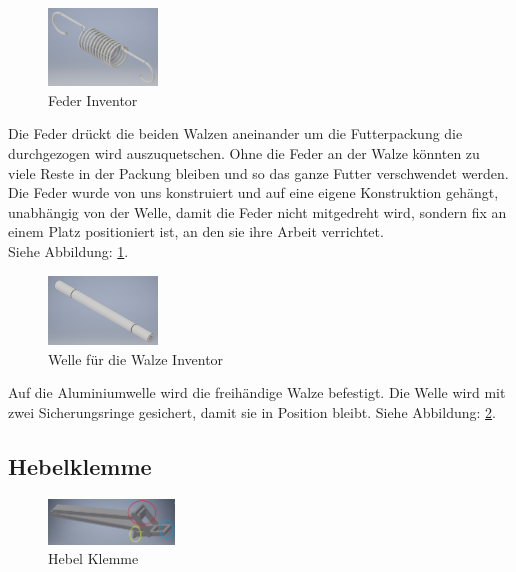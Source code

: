 \begin{figure}
\vspace{-20pt}
  \begin{center}
    \includegraphics[width=0.26\textwidth]{Bilder/Inventor/Feder}
  \end{center}
  \caption{Feder Inventor}
  \label{Feder_Inventor}
\end{figure}

Die Feder drückt die beiden Walzen aneinander um die Futterpackung die durchgezogen wird auszuquetschen. Ohne die Feder an der Walze könnten zu viele Reste in der Packung bleiben und so das ganze Futter verschwendet werden. Die Feder wurde von uns konstruiert und auf eine eigene Konstruktion gehängt, unabhängig von der Welle, damit die Feder nicht mitgedreht wird, sondern fix an einem Platz positioniert ist, an den sie ihre Arbeit verrichtet. \\Siehe Abbildung: \ref{Feder_Inventor}.\\

\begin{figure}
\vspace{-20pt}
  \begin{center}
    \includegraphics[width=0.26\textwidth]{Bilder/Inventor/Walzen_Welle}
  \end{center}
  \caption{Welle für die Walze Inventor}
  \label{Walzen_Welle_Inventor}
\end{figure}

Auf die Aluminiumwelle wird die freihändige Walze befestigt. Die Welle wird mit zwei Sicherungsringe gesichert, damit sie in Position bleibt. Siehe Abbildung: \ref{Walzen_Welle_Inventor}.\\ 
\subsection{Hebelklemme}

\begin{figure}
\vspace{-20pt}
  \begin{center}
    \includegraphics[width=0.3\textwidth]{Bilder/Inventor/Hebel_Klemme}
  \end{center}
  \caption{Hebel Klemme}
  \label{Hebel_Klemme_Inventor}
\end{figure}

